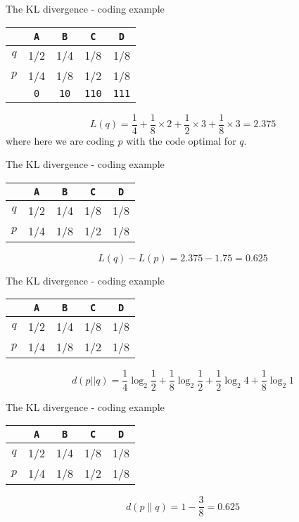 \documentclass{beamer}
\newcommand{\crish}{\color{reddish}}
\newcommand{\cbla}{\color{black}}
\newcommand{\sm}{\color{reddish}$}
\newcommand{\fm}{$\color{black}{}}
\newcommand{\letter}[1]{\color{blue}\texttt{#1}\color{black}}
\newcommand{\binary}[1]{\color{red}\texttt{#1}\color{black}}
\begin{document}
\begin{frame}{The KL divergence - coding example}
\begin{center}
\begin{tabular}{c|cccc}
&\letter{A}&\letter{B}&\letter{C}&\letter{D}\\
\hline
$q$&1/2&1/4&1/8&1/8\\
$p$&1/4&1/8&1/2&1/8\\
\hline
&\binary{0}&\binary{10}&\binary{110}&\binary{111}
\end{tabular}
\end{center}
\crish
$$
L(q)=\frac{1}{4}+\frac{1}{8}\times 2 +\frac{1}{2}\times 3+\frac{1}{8}\times 3=2.375
$$
\cbla
where here we are coding \sm{}p\fm{} with the code optimal for \sm{}q\fm{}.
\end{frame}


\begin{frame}{The KL divergence - coding example}
\begin{center}
\begin{tabular}{c|cccc}
&\letter{A}&\letter{B}&\letter{C}&\letter{D}\\
\hline
$q$&1/2&1/4&1/8&1/8\\
$p$&1/4&1/8&1/2&1/8\end{tabular}
\end{center}
\crish
$$
L(q)-L(p)=2.375-1.75=0.625
$$
\cbla
\end{frame}


\begin{frame}{The KL divergence - coding example}
\begin{center}
\begin{tabular}{c|cccc}
&\letter{A}&\letter{B}&\letter{C}&\letter{D}\\
\hline
$q$&1/2&1/4&1/8&1/8\\
$p$&1/4&1/8&1/2&1/8\\
\end{tabular}
\end{center}
\crish
$$
d(p||q)=\frac{1}{4}\log_2{\frac{1}{2}}+\frac{1}{8}\log_2{\frac{1}{2}}+\frac{1}{2}\log_2{4}+\frac{1}{8}\log_2{1}
$$
\cbla
\end{frame}


\begin{frame}{The KL divergence - coding example}
\begin{center}
\begin{tabular}{c|cccc}
&\letter{A}&\letter{B}&\letter{C}&\letter{D}\\
\hline
$q$&1/2&1/4&1/8&1/8\\
$p$&1/4&1/8&1/2&1/8\\
\end{tabular}
\end{center}
\crish
$$
d(p\|q)=1-\frac{3}{8}=0.625
$$
\cbla
\end{frame}
\end{document}
